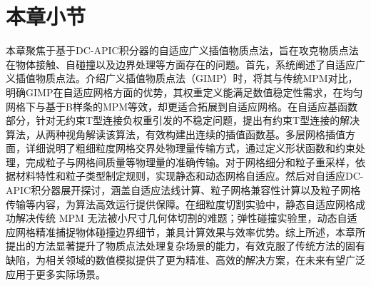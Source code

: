 \section{本章小节}
本章聚焦于基于DC-APIC积分器的自适应广义插值物质点法，旨在攻克物质点法在物体接触、自碰撞以及边界处理等方面存在的问题。首先，系统阐述了自适应广义插值物质点法。介绍广义插值物质点法（GIMP）时，将其与传统MPM对比，明确GIMP在自适应网格方面的优势，其权重定义能满足数值稳定性需求，在均匀网格下与基于B样条的MPM等效，却更适合拓展到自适应网格。在自适应基函数部分，针对无约束T型连接负权重引发的不稳定问题，提出有约束T型连接的解决算法，从两种视角解读该算法，有效构建出连续的插值函数基。多层网格插值方面，详细说明了粗细粒度网格交界处物理量传输方式，通过定义形状函数和约束处理，完成粒子与网格间质量等物理量的准确传输。对于网格细分和粒子重采样，依据材料特性和粒子类型制定规则，实现静态和动态网格自适应。然后对自适应DC-APIC积分器展开探讨，涵盖自适应法线计算、粒子网格兼容性计算以及粒子网格传输等内容，为算法高效运行提供保障。在细粒度切割实验中，静态自适应网格成功解决传统 MPM 无法被小尺寸几何体切割的难题；弹性碰撞实验里，动态自适应网格精准捕捉物体碰撞边界细节，兼具计算效果与效率优势。综上所述，本章所提出的方法显著提升了物质点法处理复杂场景的能力，有效克服了传统方法的固有缺陷，为相关领域的数值模拟提供了更为精准、高效的解决方案，在未来有望广泛应用于更多实际场景。
